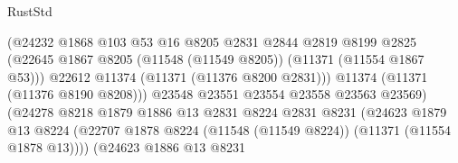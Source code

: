 \begin{lexlean}{RustStd}
\begin{coremodule}
                                            (@24232
                                              @1868
                                              @103
                                              @53
                                              @16
                                              @8205
                                              @2831
                                              @2844
                                              @2819
                                              @8199
                                              @2825
                                              (@22645
                                                @1867
                                                @8205
                                                (@11548 (@11549 @8205))
                                                (@11371 (@11554 @1867 @53)))
                                              @22612
                                              @11374
                                              (@11371 (@11376 @8200 @2831)))
                                            @11374
                                            (@11371 (@11376 @8190 @8208)))
                                          @23548
                                          @23551
                                          @23554
                                          @23558
                                          @23563
                                          @23569)
                                        (@24278
                                          @8218
                                          @1879
                                          @1886
                                          @13
                                          @2831
                                          @8224
                                          @2831
                                          @8231
                                          (@24623
                                            @1879
                                            @13
                                            @8224
                                            (@22707
                                              @1878
                                              @8224
                                              (@11548 (@11549 @8224))
                                              (@11371 (@11554 @1878 @13))))
                                          (@24623
                                            @1886
                                            @13
                                            @8231

\end{coremodule}
\end{lexlean}
